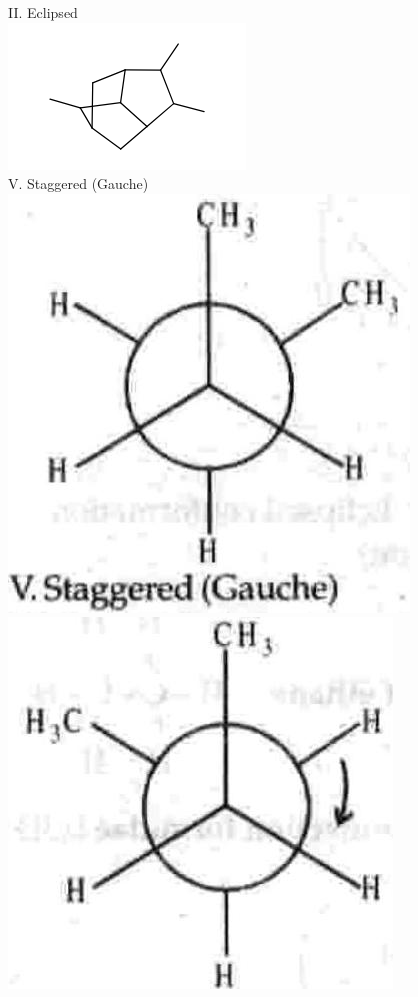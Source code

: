 \documentclass[10pt]{article}
\begin{document}
II. Eclipsed\\
\includegraphics{smile-987dc499fce14abfd7bd2461118ed176f1414ff9}\\
V. Staggered (Gauche)\\
\includegraphics[max width=\textwidth, center]{2025_01_28_8470952b98110cec3aabg-060(1)}\\
\includegraphics[max width=\textwidth, center]{2025_01_28_8470952b98110cec3aabg-060}\\
\end{document}
